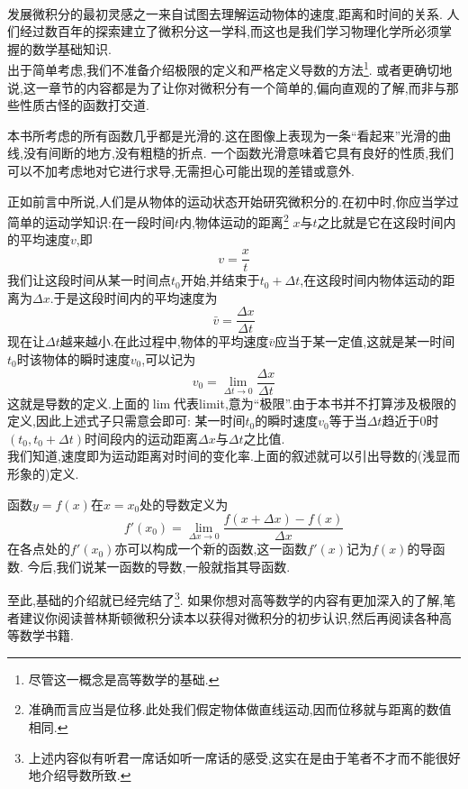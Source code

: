 \documentclass{ctexart}
\begin{document}
\pagestyle{plain}
\noindent{}\vspace{15pt}\\
\indent 发展微积分的最初灵感之一来自试图去理解运动物体的速度,距离和时间的关系.%
人们经过数百年的探索建立了微积分这一学科,而这也是我们学习物理化学所必须掌握的数学基础知识.\vspace{12pt}\\
\indent 出于简单考虑,我们不准备介绍极限的定义和严格定义导数的方法\footnote{尽管这一概念是高等数学的基础.}.%
或者更确切地说,这一章节的内容都是为了让你对微积分有一个简单的,偏向直观的了解,而非与那些性质古怪的函数打交道.
\begin{hint}
    本书所考虑的所有函数几乎都是光滑的.这在图像上表现为一条“看起来”光滑的曲线,没有间断的地方,没有粗糙的折点.%
    一个函数光滑意味着它具有良好的性质,我们可以不加考虑地对它进行求导,无需担心可能出现的差错或意外.
\end{hint}
正如前言中所说,人们是从物体的运动状态开始研究微积分的.在初中时,你应当学过简单的运动学知识:在一段时间$t$内,物体运动的距离\footnote{准确而言应当是位移.此处我们假定物体做直线运动,因而位移就与距离的数值相同.}%
$x$与$t$之比就是它在这段时间内的平均速度$v$,即
\[v=\dfrac xt\]
我们让这段时间从某一时间点$t_0$开始,并结束于$t_0+\Delta t$,在这段时间内物体运动的距离为$\Delta x$.于是这段时间内的平均速度为
\[\bar{v}=\dfrac{\Delta x}{\Delta t}\]
现在让$\Delta t$越来越小.在此过程中,物体的平均速度$\bar{v}$应当于某一定值,这就是某一时间$t_0$时该物体的瞬时速度$v_0$,可以记为
\[v_0=\lim_{\Delta t\to 0}\dfrac{\Delta x}{\Delta t}\]
这就是导数的定义.上面的$\lim$代表limit,意为“极限”.由于本书并不打算涉及极限的定义,因此上述式子只需意会即可:%
某一时间$t_0$的瞬时速度$v_0$等于当$\Delta t$趋近于$0$时$\left(t_0,t_0+\Delta t\right)$时间段内的运动距离$\Delta x$与$\Delta t$之比值.\\
\indent 我们知道,速度即为运动距离对时间的变化率.上面的叙述就可以引出导数的(浅显而形象的)定义.
\begin{definition}[0A.1.1 导数]
    函数$y=f(x)$在$x=x_0$处的导数定义为
    \[f'\left(x_0\right)=\lim_{\Delta x\to 0}\dfrac{f\left(x+\Delta x\right)-f(x)}{\Delta x}\]
    在各点处的$f'\left(x_0\right)$亦可以构成一个新的函数,这一函数$f'(x)$记为$f(x)$的导函数.%
    今后,我们说某一函数的导数,一般就指其导函数.
\end{definition}
至此,基础的介绍就已经完结了\footnote{上述内容似有听君一席话如听一席话的感受,这实在是由于笔者不才而不能很好地介绍导数所致.}.%
如果你想对高等数学的内容有更加深入的了解,笔者建议你阅读普林斯顿微积分读本以获得对微积分的初步认识,然后再阅读各种高等数学书籍.\vspace{4pt}\\
\end{document}
